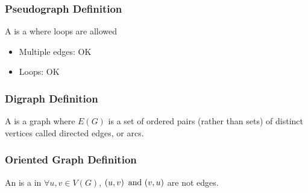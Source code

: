 \subsubsection*{Pseudograph Definition}
A  is a  where loops are allowed
\begin{itemize}
    \item Multiple edges: OK
    \item Loops: OK
\end{itemize}

\subsubsection*{Digraph Definition}
A  is a graph where $E(G)$ is a set of ordered pairs (rather than sets) of distinct vertices called directed edges, or arcs.

\subsubsection*{Oriented Graph Definition}
An  is a  in $\forall u,v \in V(G)$, $(u,v) \operatorname{~\text{and}~} (v,u)$ are not  edges.